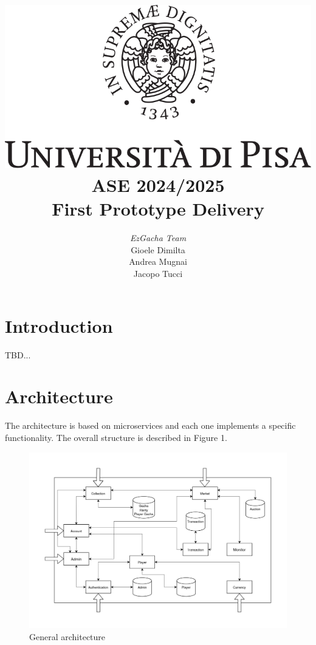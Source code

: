 \documentclass{article}
\begin{document}
\title{\includegraphics[scale=.2]{logo.png} \\[3ex] ASE 2024/2025 \\ First Prototype Delivery}
\author{{\large \emph{EzGacha Team}} \\[1ex] Gioele Dimilta \\ Andrea Mugnai \\ Jacopo Tucci}
\date{}

\maketitle

\newpage
{}
\tableofcontents

\newpage
\section{Introduction}
TBD...

\section{Architecture}
The architecture is based on microservices and each one implements a specific functionality. The overall structure is described in Figure 1.
\begin{figure}[ht]
    \centering
    \includegraphics[width=12cm]{architecture-v2.drawio.png}
    \caption{General architecture}
\end{figure}
\end{document}
